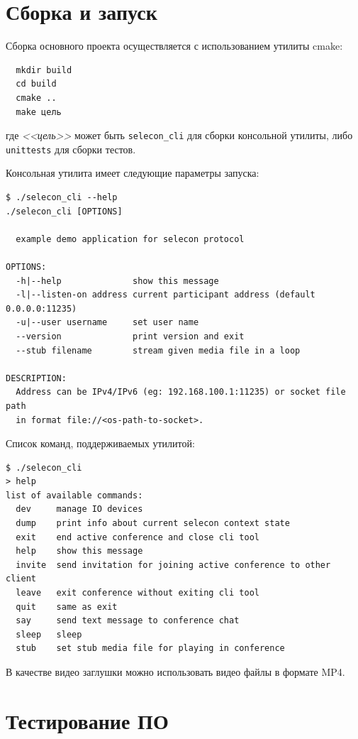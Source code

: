 \clearpage

\section{Сборка и запуск}

Сборка основного проекта осуществляется с использованием утилиты cmake:

{\fontsize{11pt}{9pt}\selectfont
\begin{verbatim}
  mkdir build
  cd build
  cmake ..
  make цель
\end{verbatim}}
где \textit{<<цель>>} может быть \texttt{selecon\_cli} для сборки консольной утилиты, либо \texttt{unittests} для сборки тестов.

Консольная утилита имеет следующие параметры запуска:

{\fontsize{11pt}{9pt}\selectfont
\begin{verbatim}
$ ./selecon_cli --help
./selecon_cli [OPTIONS]

  example demo application for selecon protocol

OPTIONS:
  -h|--help              show this message
  -l|--listen-on address current participant address (default 0.0.0.0:11235)
  -u|--user username     set user name
  --version              print version and exit
  --stub filename        stream given media file in a loop

DESCRIPTION:
  Address can be IPv4/IPv6 (eg: 192.168.100.1:11235) or socket file path
  in format file://<os-path-to-socket>.
\end{verbatim}}

Список команд, поддерживаемых утилитой:

{\fontsize{11pt}{9pt}\selectfont
\begin{verbatim}
$ ./selecon_cli
> help
list of available commands:
  dev     manage IO devices
  dump    print info about current selecon context state
  exit    end active conference and close cli tool
  help    show this message
  invite  send invitation for joining active conference to other client
  leave   exit conference without exiting cli tool
  quit    same as exit
  say     send text message to conference chat
  sleep   sleep
  stub    set stub media file for playing in conference
\end{verbatim}}

В качестве видео заглушки можно использовать видео файлы в формате MP4.

\clearpage

\section{Тестирование ПО}

